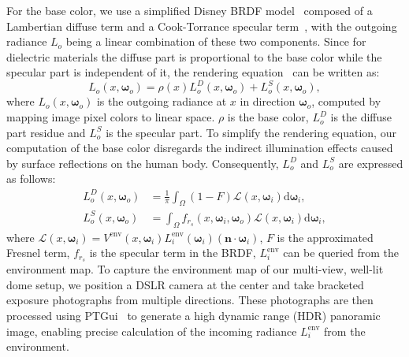 For the base color, we use a simplified Disney BRDF model~\cite{burley2012physically} composed of a Lambertian diffuse term and a Cook-Torrance specular term~\cite{cook1982reflectance}, with the outgoing radiance $L_{o}$ being a linear combination of these two components. Since for dielectric materials the diffuse part is proportional to the base color while the specular part is independent of it, the rendering equation~\cite{kajiya1986rendering} can be written as: 
\begin{equation}
    L_o\left(x,\boldsymbol{\omega}_{o}\right) = \rho(x) L_{o}^D\left(x,\boldsymbol{\omega}_{o}\right) + L_{o}^S\left(x,\boldsymbol{\omega}_{o}\right),
\end{equation}
where $L_o\left(x,\boldsymbol{\omega}_{o}\right)$ is the outgoing radiance at $x$ in direction $\boldsymbol{\omega}_{o}$, computed by mapping image pixel colors to linear space. $\rho$ is the base color, $L_{o}^D$ is the diffuse part residue and $L_{o}^S$ is the specular part.
To simplify the rendering equation, our computation of the base color disregards the indirect illumination effects caused by surface reflections on the human body. Consequently, $L_{o}^D$ and $L_{o}^S$ are expressed as follows:
\begin{align}
\label{equ_LoD}
     L_{o}^D\left(x,\boldsymbol{\omega}_{o}\right) &= \frac{1}{\pi  } \int_\Omega 
     \left(1-F\right)  \mathcal{L}(x,\boldsymbol{\omega}_i) \mathrm{d} \boldsymbol{\omega}_{i},  \\
    \label{equ_LoS}
     L_{o}^S\left(x,\boldsymbol{\omega}_{o}\right) &= \int_\Omega f_{r_s}\left(x,\boldsymbol{\omega}_{i}, \boldsymbol{\omega}_{o}\right)  \mathcal{L}(x,\boldsymbol{\omega}_i) \mathrm{d} \boldsymbol{\omega}_{i},
\end{align}
where $\mathcal{L}(x,\boldsymbol{\omega}_i) = V^{\text{env}}\left(x,\boldsymbol{\omega}_{i}\right) L_{i}^{\text{env}}\left(\boldsymbol{\omega}_{i}\right) (\mathbf{n} \cdot \boldsymbol{\omega}_{i})$, $F$ is the approximated Fresnel term, $f_{r_s}$ is the specular term in the BRDF, $L_{i}^{\text{env}}$ can be queried from the environment map. To capture the environment map of our multi-view, well-lit dome setup, we position a DSLR camera at the center and take bracketed exposure photographs from multiple directions. These photographs are then processed using PTGui~\cite{new_house_internet_services_bv_ptgui_2025} to generate a high dynamic range (HDR) panoramic image, enabling precise calculation of the incoming radiance $L_i^{\text{env}}$ from the environment.


